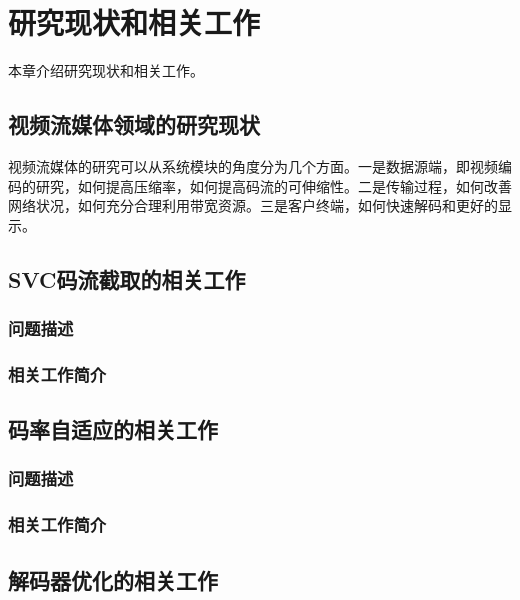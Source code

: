 \chapter{研究现状和相关工作}
本章介绍研究现状和相关工作。

\section{视频流媒体领域的研究现状}

视频流媒体的研究可以从系统模块的角度分为几个方面。一是数据源端，即视频编码的研究，如何提高压缩率，如何提高码流的可伸缩性。二是传输过程，如何改善网络状况，如何充分合理利用带宽资源。三是客户终端，如何快速解码和更好的显示。

\section{SVC码流截取的相关工作}

\subsection{问题描述}

\subsection{相关工作简介}

\section{码率自适应的相关工作}

\subsection{问题描述}

\subsection{相关工作简介}

\section{解码器优化的相关工作}
